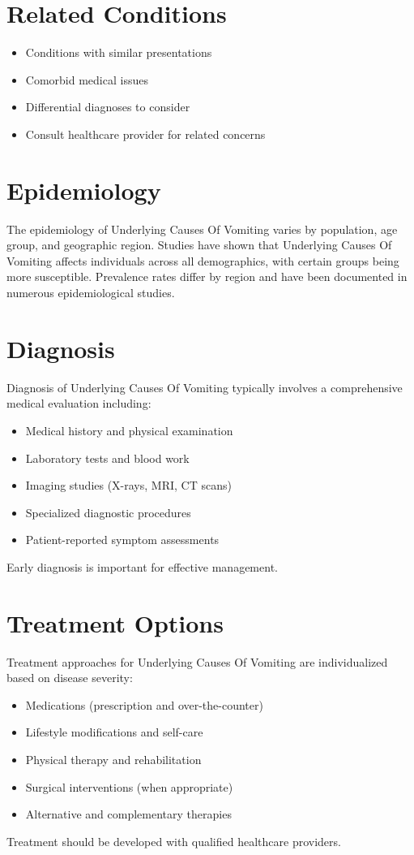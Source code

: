 \section*{Related Conditions}
\begin{itemize}
  \item Conditions with similar presentations
  \item Comorbid medical issues
  \item Differential diagnoses to consider
  \item Consult healthcare provider for related concerns
\end{itemize}

\section*{Epidemiology}
The epidemiology of Underlying Causes Of Vomiting varies by population, age group, and geographic region. Studies have shown that Underlying Causes Of Vomiting affects individuals across all demographics, with certain groups being more susceptible. Prevalence rates differ by region and have been documented in numerous epidemiological studies.

\section*{Diagnosis}
Diagnosis of Underlying Causes Of Vomiting typically involves a comprehensive medical evaluation including:
\begin{itemize}
  \item Medical history and physical examination
  \item Laboratory tests and blood work
  \item Imaging studies (X-rays, MRI, CT scans)
  \item Specialized diagnostic procedures
  \item Patient-reported symptom assessments
\end{itemize}
Early diagnosis is important for effective management.

\section*{Treatment Options}
Treatment approaches for Underlying Causes Of Vomiting are individualized based on disease severity:
\begin{itemize}
  \item Medications (prescription and over-the-counter)
  \item Lifestyle modifications and self-care
  \item Physical therapy and rehabilitation
  \item Surgical interventions (when appropriate)
  \item Alternative and complementary therapies
\end{itemize}
Treatment should be developed with qualified healthcare providers.

